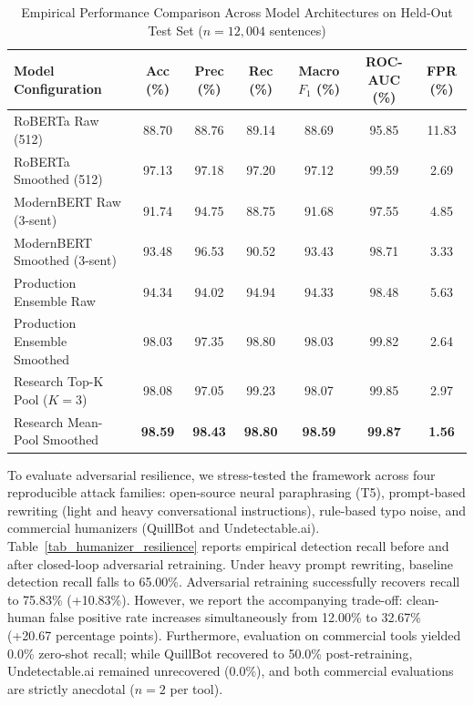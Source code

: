 \documentclass[conference]{IEEEtran}
\begin{document}
\begin{table}[htbp]
\caption{Empirical Performance Comparison Across Model Architectures on Held-Out Test Set ($n=12,004$ sentences)}
\label{tab_model_performance}
\centering
\begin{tabular}{lcccccc}
\toprule
\textbf{Model Configuration} & \textbf{Acc (\%)} & \textbf{Prec (\%)} & \textbf{Rec (\%)} & \textbf{Macro $F_1$ (\%)} & \textbf{ROC-AUC (\%)} & \textbf{FPR (\%)} \\
\midrule
RoBERTa Raw (512) & 88.70 & 88.76 & 89.14 & 88.69 & 95.85 & 11.83 \\
RoBERTa Smoothed (512) & 97.13 & 97.18 & 97.20 & 97.12 & 99.59 & 2.69 \\
ModernBERT Raw (3-sent) & 91.74 & 94.75 & 88.75 & 91.68 & 97.55 & 4.85 \\
ModernBERT Smoothed (3-sent) & 93.48 & 96.53 & 90.52 & 93.43 & 98.71 & 3.33 \\
Production Ensemble Raw & 94.34 & 94.02 & 94.94 & 94.33 & 98.48 & 5.63 \\
Production Ensemble Smoothed & 98.03 & 97.35 & 98.80 & 98.03 & 99.82 & 2.64 \\
Research Top-K Pool ($K=3$) & 98.08 & 97.05 & 99.23 & 98.07 & 99.85 & 2.97 \\
Research Mean-Pool Smoothed & \textbf{98.59} & \textbf{98.43} & \textbf{98.80} & \textbf{98.59} & \textbf{99.87} & \textbf{1.56} \\
\bottomrule
\end{tabular}
\end{table}

To evaluate adversarial resilience, we stress-tested the framework across four reproducible attack families: open-source neural paraphrasing (T5), prompt-based rewriting (light and heavy conversational instructions), rule-based typo noise, and commercial humanizers (QuillBot and Undetectable.ai). Table~\ref{tab_humanizer_resilience} reports empirical detection recall before and after closed-loop adversarial retraining. Under heavy prompt rewriting, baseline detection recall falls to 65.00\%. Adversarial retraining successfully recovers recall to 75.83\% (+10.83\%). However, we report the accompanying trade-off: clean-human false positive rate increases simultaneously from 12.00\% to 32.67\% (+20.67 percentage points). Furthermore, evaluation on commercial tools yielded 0.0\% zero-shot recall; while QuillBot recovered to 50.0\% post-retraining, Undetectable.ai remained unrecovered (0.0\%), and both commercial evaluations are strictly anecdotal ($n=2$ per tool).
\end{document}
